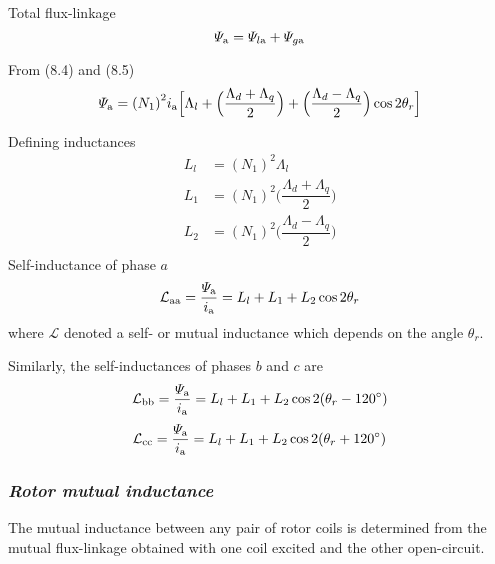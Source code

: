 \documentclass[a4paper,numbers=noenddot,12pt]{scrbook}
\begin{document}
Total flux-linkage
\begin{equation}
    \varPsi_{\textup{a}} = \varPsi_{l\textup{a}} + \varPsi_{g\textup{a}}
    \label{eq:Eq8.6}
\end{equation}

From (8.4) and (8.5)
\begin{equation}
    \varPsi_{\textup{a}} = {(N_1)}^2 i_{\textup{a}} \Big[ \Lambda_l + \Big( \dfrac{\Lambda_d + \Lambda_q}{2}\Big) + \Big( \dfrac{\Lambda_d - \Lambda_q}{2}\Big) \cos2\theta_r\Big]
    \label{eq:Eq8.7}
\end{equation}

Defining inductances
\begin{equation}
    \begin{aligned}
        L_l & ={(N_1)}^2 \Lambda_l \\
        L_1 & = {(N_1)}^2 \Big( \dfrac{\Lambda_d + \Lambda_q}{2}\Big) \\
        L_2 & = {(N_1)}^2 \Big( \dfrac{\Lambda_d - \Lambda_q}{2}\Big) \\
    \end{aligned}
    \label{eq:Eq8.8}
\end{equation}
Self-inductance of phase $a$
\begin{equation}
    \mathcal{L}_{\textup{aa}} = \dfrac{\varPsi_{\textup{a}}}{i_{\textup{a}}} = L_l +L_1 +L_2 \cos 2\theta_r
    \label{eq:Eq8.9}
\end{equation}
where $\mathcal{L}$ denoted a self- or mutual inductance which depends on the angle $\theta_r$.

Similarly, the self-inductances of phases $b$ and $c$ are
\begin{equation}
    \mathcal{L}_{\textup{bb}} = \dfrac{\varPsi_{\textup{a}}}{i_{\textup{a}}} = L_l +L_1 +L_2 \cos 2(\theta_r - 120^{\circ})
    \label{eq:Eq8.10}
\end{equation}
\begin{equation}
    \mathcal{L}_{\textup{cc}} = \dfrac{\varPsi_{\textup{a}}}{i_{\textup{a}}} = L_l +L_1 +L_2 \cos 2(\theta_r + 120^{\circ})
    \label{eq:Eq8.11}
\end{equation}

\subsubsection{\textit{Rotor mutual inductance}} The mutual inductance between any pair of rotor coils is determined from the mutual flux-linkage obtained with one coil excited and the other open-circuit.
\end{document}
